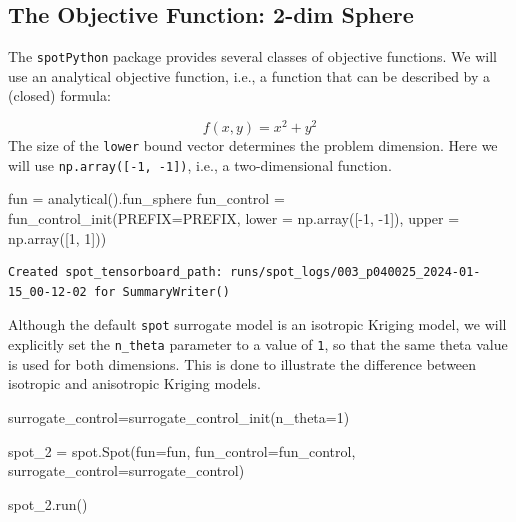 \documentclass[
  letterpaper,
  DIV=11,
  numbers=noendperiod]{scrreprt}
\newenvironment{Shaded}{\begin{snugshade}}{\end{snugshade}}
\newcommand{\DecValTok}[1]{\textcolor[rgb]{0.68,0.00,0.00}{#1}}
\newcommand{\NormalTok}[1]{\textcolor[rgb]{0.00,0.23,0.31}{#1}}
\newcommand{\OperatorTok}[1]{\textcolor[rgb]{0.37,0.37,0.37}{#1}}
\begin{document}
\subsection{The Objective Function: 2-dim
Sphere}\label{the-objective-function-2-dim-sphere}

The \texttt{spotPython} package provides several classes of objective
functions. We will use an analytical objective function, i.e., a
function that can be described by a (closed) formula:

\[
f(x, y) = x^2 + y^2
\] The size of the \texttt{lower} bound vector determines the problem
dimension. Here we will use \texttt{np.array({[}-1,\ -1{]})}, i.e., a
two-dimensional function.

\begin{Shaded}
\begin{Highlighting}[]
\NormalTok{fun }\OperatorTok{=}\NormalTok{ analytical().fun\_sphere}
\NormalTok{fun\_control }\OperatorTok{=}\NormalTok{ fun\_control\_init(PREFIX}\OperatorTok{=}\NormalTok{PREFIX,}
\NormalTok{                               lower }\OperatorTok{=}\NormalTok{ np.array([}\OperatorTok{{-}}\DecValTok{1}\NormalTok{, }\OperatorTok{{-}}\DecValTok{1}\NormalTok{]),}
\NormalTok{                               upper }\OperatorTok{=}\NormalTok{ np.array([}\DecValTok{1}\NormalTok{, }\DecValTok{1}\NormalTok{]))}
\end{Highlighting}
\end{Shaded}

\begin{verbatim}
Created spot_tensorboard_path: runs/spot_logs/003_p040025_2024-01-15_00-12-02 for SummaryWriter()
\end{verbatim}

Although the default \texttt{spot} surrogate model is an isotropic
Kriging model, we will explicitly set the \texttt{n\_theta} parameter to
a value of \texttt{1}, so that the same theta value is used for both
dimensions. This is done to illustrate the difference between isotropic
and anisotropic Kriging models.

\begin{Shaded}
\begin{Highlighting}[]
\NormalTok{surrogate\_control}\OperatorTok{=}\NormalTok{surrogate\_control\_init(n\_theta}\OperatorTok{=}\DecValTok{1}\NormalTok{)}
\end{Highlighting}
\end{Shaded}

\begin{Shaded}
\begin{Highlighting}[]
\NormalTok{spot\_2 }\OperatorTok{=}\NormalTok{ spot.Spot(fun}\OperatorTok{=}\NormalTok{fun,}
\NormalTok{                   fun\_control}\OperatorTok{=}\NormalTok{fun\_control,}
\NormalTok{                   surrogate\_control}\OperatorTok{=}\NormalTok{surrogate\_control)}

\NormalTok{spot\_2.run()}
\end{Highlighting}
\end{Shaded}
\end{document}
